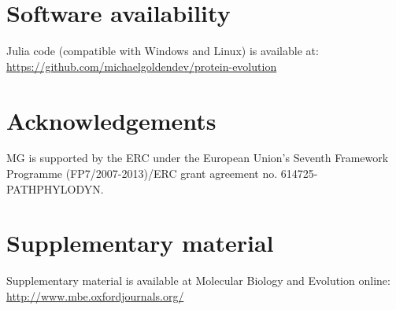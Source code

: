 \documentclass[nogrid]{MBE}%
\begin{document}
\section{Software availability}
Julia code (compatible with Windows and Linux) is available at: \href{https://github.com/michaelgoldendev/protein-evolution}{https://github.com/michaelgoldendev/protein-evolution}

\section{Acknowledgements}
MG is supported by the ERC under the European Union’s Seventh Framework Programme (FP7/2007-2013)/ERC grant agreement no. 614725-PATHPHYLODYN. 

\ifmbeformat
\section{Supplementary material}
Supplementary material is available  at Molecular Biology and Evolution
online: \url{http://www.mbe.oxfordjournals.org/}
\fi

\end{document}
